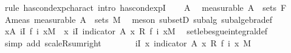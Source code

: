 \begin{isabellebody}
%
\isadelimproof
%
\endisadelimproof
%
\isatagproof
{}\isamarkupfalse%
\ {\isacharparenleft}{\kern0pt}rule\ has{\isacharunderscore}{\kern0pt}cond{\isacharunderscore}{\kern0pt}exp{\isacharunderscore}{\kern0pt}charact{\isacharcomma}{\kern0pt}\ intro\ has{\isacharunderscore}{\kern0pt}cond{\isacharunderscore}{\kern0pt}expI{\isacharprime}{\kern0pt}{\isacharparenright}{\kern0pt}\isanewline
\ \ \isamarkupfalse%
\ A\ \isamarkupfalse%
\ {\isacharbrackleft}{\kern0pt}measurable{\isacharbrackright}{\kern0pt}{\isacharcolon}{\kern0pt}\ {\isachardoublequoteopen}A\ {\isasymin}\ sets\ F{\isachardoublequoteclose}\isanewline
\ \ \isamarkupfalse%
\ \isamarkupfalse%
\ A{\isacharunderscore}{\kern0pt}meas\ {\isacharbrackleft}{\kern0pt}measurable{\isacharbrackright}{\kern0pt}{\isacharcolon}{\kern0pt}\ {\isachardoublequoteopen}A\ {\isasymin}\ sets\ M{\isachardoublequoteclose}\ \isamarkupfalse%
\ {\isacharparenleft}{\kern0pt}meson\ subsetD\ subalg\ subalgebra{\isacharunderscore}{\kern0pt}def{\isacharparenright}{\kern0pt}\isanewline
\isanewline
\ \ \isamarkupfalse%
\ {\isachardoublequoteopen}{\isacharparenleft}{\kern0pt}{\isasymintegral}x{\isasymin}A{\isachardot}{\kern0pt}\ {\isacharparenleft}{\kern0pt}{\isasymSum}i{\isasymin}I{\isachardot}{\kern0pt}\ f\ i\ x{\isacharparenright}{\kern0pt}{\isasympartial}M{\isacharparenright}{\kern0pt}\ {\isacharequal}{\kern0pt}\ {\isacharparenleft}{\kern0pt}{\isasymintegral}x{\isachardot}{\kern0pt}\ {\isacharparenleft}{\kern0pt}{\isasymSum}i{\isasymin}I{\isachardot}{\kern0pt}\ indicator\ A\ x\ {\isacharasterisk}{\kern0pt}\isactrlsub R\ f\ i\ x{\isacharparenright}{\kern0pt}{\isasympartial}M{\isacharparenright}{\kern0pt}{\isachardoublequoteclose}\ \isamarkupfalse%
\ set{\isacharunderscore}{\kern0pt}lebesgue{\isacharunderscore}{\kern0pt}integral{\isacharunderscore}{\kern0pt}def\ \isamarkupfalse%
\ {\isacharparenleft}{\kern0pt}simp\ add{\isacharcolon}{\kern0pt}\ scaleR{\isacharunderscore}{\kern0pt}sum{\isacharunderscore}{\kern0pt}right{\isacharparenright}{\kern0pt}\isanewline
\ \ \isamarkupfalse%
\ \isamarkupfalse%
\ {\isachardoublequoteopen}{\isachardot}{\kern0pt}{\isachardot}{\kern0pt}{\isachardot}{\kern0pt}\ {\isacharequal}{\kern0pt}\ {\isacharparenleft}{\kern0pt}{\isasymSum}i{\isasymin}I{\isachardot}{\kern0pt}\ {\isacharparenleft}{\kern0pt}{\isasymintegral}x{\isachardot}{\kern0pt}\ indicator\ A\ x\ {\isacharasterisk}{\kern0pt}\isactrlsub R\ f\ i\ x\ {\isasympartial}M{\isacharparenright}{\kern0pt}{\isacharparenright}{\kern0pt}{\isachardoublequoteclose}\ \isamarkupfalse%

\end{isabellebody}
